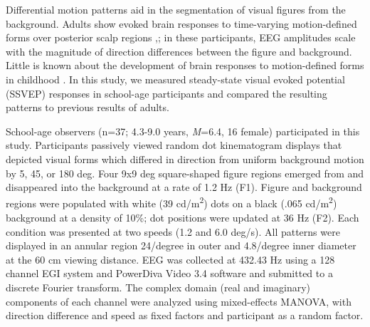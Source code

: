 \documentclass[landscape,final,paperwidth=72in,paperheight=42in,fontscale=0.285]{baposter}
\begin{document}
\begin{poster}
    {
      Differential motion patterns aid in the segmentation of visual figures from the background. 
Adults show evoked brain responses to time-varying motion-defined forms over posterior scalp regions \cite{fesi_cortical_2014},\cite{fesi_distinct_2011}; in these participants, EEG amplitudes scale with the magnitude of direction differences between the figure and background.
      Little is known about the development of brain responses to motion-defined forms in childhood \cite{gilmore_childrens_2016}. In this study, we measured steady-state visual evoked potential (SSVEP) responses in school-age participants and compared the resulting patterns to previous results of adults.    
    }

    {
      School-age observers (n=37; 4.3-9.0 years, \emph{M}=6.4, 16 female) participated in this study.  
      Participants passively viewed random dot kinematogram displays that depicted visual forms which differed in direction from uniform background motion by 5, 45, or 180 deg. Four 9x9 deg square-shaped figure regions emerged from and disappeared into the background at a rate of 1.2 Hz (F1). Figure and background regions were populated with white (39 cd/m\textsuperscript{2}) dots on a black (.065 cd/m\textsuperscript{2}) background at a density of 10\%; dot positions were updated at 36 Hz (F2). Each condition was presented at two speeds (1.2 and 6.0 deg/s). All patterns were displayed in an annular region 24/degree in outer and 4.8/degree inner diameter at the 60 cm viewing distance.  
      EEG was collected at 432.43 Hz using a 128 channel EGI system and PowerDiva Video 3.4 software and submitted to a discrete Fourier transform. 
      The complex domain (real and imaginary) components of each channel were analyzed using mixed-effects MANOVA, with direction difference and speed as fixed factors and participant as a random factor.  
      }

    {
      \vspace{3em}
        
}
\end{poster}
\end{document}
